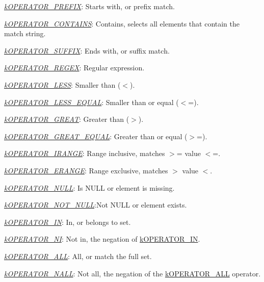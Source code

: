 {\begin{DoxyItemize}
\begin{DoxyItemize}
\begin{DoxyItemize}
\begin{DoxyItemize}
\item {\itshape \hyperlink{}{k\-O\-P\-E\-R\-A\-T\-O\-R\-\_\-\-P\-R\-E\-F\-I\-X}}\-: Starts with, or prefix match. 
\item {\itshape \hyperlink{}{k\-O\-P\-E\-R\-A\-T\-O\-R\-\_\-\-C\-O\-N\-T\-A\-I\-N\-S}}\-: Contains, selects all elements that contain the match string. 
\item {\itshape \hyperlink{}{k\-O\-P\-E\-R\-A\-T\-O\-R\-\_\-\-S\-U\-F\-F\-I\-X}}\-: Ends with, or suffix match. 
\item {\itshape \hyperlink{}{k\-O\-P\-E\-R\-A\-T\-O\-R\-\_\-\-R\-E\-G\-E\-X}}\-: Regular expression. 
\item {\itshape \hyperlink{}{k\-O\-P\-E\-R\-A\-T\-O\-R\-\_\-\-L\-E\-S\-S}}\-: Smaller than ({\ttfamily $<$}). 
\item {\itshape \hyperlink{}{k\-O\-P\-E\-R\-A\-T\-O\-R\-\_\-\-L\-E\-S\-S\-\_\-\-E\-Q\-U\-A\-L}}\-: Smaller than or equal ({\ttfamily $<$=}). 
\item {\itshape \hyperlink{}{k\-O\-P\-E\-R\-A\-T\-O\-R\-\_\-\-G\-R\-E\-A\-T}}\-: Greater than ({\ttfamily $>$}). 
\item {\itshape \hyperlink{}{k\-O\-P\-E\-R\-A\-T\-O\-R\-\_\-\-G\-R\-E\-A\-T\-\_\-\-E\-Q\-U\-A\-L}}\-: Greater than or equal ({\ttfamily $>$=}). 
\item {\itshape \hyperlink{}{k\-O\-P\-E\-R\-A\-T\-O\-R\-\_\-\-I\-R\-A\-N\-G\-E}}\-: Range inclusive, matches {\ttfamily $>$= value $<$=}. 
\item {\itshape \hyperlink{}{k\-O\-P\-E\-R\-A\-T\-O\-R\-\_\-\-E\-R\-A\-N\-G\-E}}\-: Range exclusive, matches {\ttfamily $>$ value $<$}. 
\item {\itshape \hyperlink{}{k\-O\-P\-E\-R\-A\-T\-O\-R\-\_\-\-N\-U\-L\-L}}\-: Is {\ttfamily N\-U\-L\-L} or element is missing. 
\item {\itshape \hyperlink{}{k\-O\-P\-E\-R\-A\-T\-O\-R\-\_\-\-N\-O\-T\-\_\-\-N\-U\-L\-L}}\-:Not {\ttfamily N\-U\-L\-L} or element exists. 
\item {\itshape \hyperlink{}{k\-O\-P\-E\-R\-A\-T\-O\-R\-\_\-\-I\-N}}\-: In, or belongs to set. 
\item {\itshape \hyperlink{}{k\-O\-P\-E\-R\-A\-T\-O\-R\-\_\-\-N\-I}}\-: Not in, the negation of \hyperlink{}{k\-O\-P\-E\-R\-A\-T\-O\-R\-\_\-\-I\-N}. 
\item {\itshape \hyperlink{}{k\-O\-P\-E\-R\-A\-T\-O\-R\-\_\-\-A\-L\-L}}\-: All, or match the full set. 
\item {\itshape \hyperlink{}{k\-O\-P\-E\-R\-A\-T\-O\-R\-\_\-\-N\-A\-L\-L}}\-: Not all, the negation of the \hyperlink{}{k\-O\-P\-E\-R\-A\-T\-O\-R\-\_\-\-A\-L\-L} operator. 

\end{DoxyItemize}
\end{DoxyItemize}
\end{DoxyItemize}
\end{DoxyItemize}}
